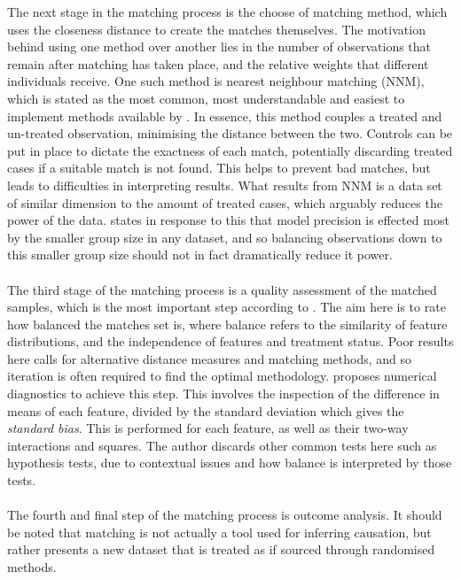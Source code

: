 {The next stage in the matching process is the choose of matching method, which uses the closeness distance to create the matches themselves. The motivation behind using one method over another lies in the number of observations that remain after matching has taken place, and the relative weights that different individuals receive. One such method is nearest neighbour matching (NNM), which is stated as the most common, most understandable and easiest to implement methods available by \cite{stuart2010matching}. In essence, this method couples a treated and un-treated observation, minimising the distance between the two. Controls can be put in place to dictate the exactness of each match, potentially discarding treated cases if a suitable match is not found. This helps to prevent bad matches, but leads to difficulties in interpreting results. What results from NNM is a data set of similar dimension to the amount of treated cases, which arguably reduces the power of the data. \cite{stuart2010matching} states in response to this that model precision is effected most by the smaller group size in any dataset, and so balancing observations down to this smaller group size should not in fact dramatically reduce it power. 
\\\\
The third stage of the matching process is a quality assessment of the matched samples, which is the most important step according to \cite{stuart2010matching}. The aim here is to rate how balanced the matches set is, where balance refers to the similarity of feature distributions, and the independence of features and treatment status. Poor results here calls for alternative distance measures and matching methods, and so iteration is often required to find the optimal methodology. \cite{stuart2010matching} proposes numerical diagnostics to achieve this step. This involves the inspection of the difference in means of each feature, divided by the standard deviation which gives the {\it standard bias}. This is performed for each feature, as well as their two-way interactions and squares. The author discards other common tests here such as hypothesis tests, due to contextual issues and how balance is interpreted by those tests. 
\\\\
The fourth and final step of the matching process is outcome analysis. It should be noted that matching is not actually a tool used for inferring causation, but rather presents a new dataset that is treated as if sourced through randomised methods.  
\\\\
}

